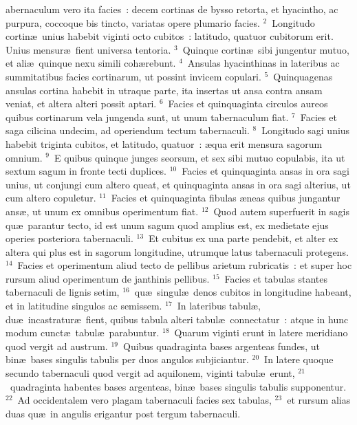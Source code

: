 \bchapter
{}abernaculum vero ita facies~: decem cortinas de bysso retorta, et hyacintho, ac purpura, coccoque bis tincto, variatas opere plumario facies.
${}^{2}$~Longitudo cortin\ae\ unius habebit viginti octo cubitos~: latitudo, quatuor cubitorum erit. Unius mensur\ae\ fient universa tentoria.
${}^{3}$~Quinque cortin\ae\ sibi jungentur mutuo, et ali\ae\ quinque nexu simili coh\ae rebunt.
${}^{4}$~Ansulas hyacinthinas in lateribus ac summitatibus facies cortinarum, ut possint invicem copulari.
${}^{5}$~Quinquagenas ansulas cortina habebit in utraque parte, ita insertas ut ansa contra ansam veniat, et altera alteri possit aptari.
${}^{6}$~Facies et quinquaginta circulos aureos quibus cortinarum vela jungenda sunt, ut unum tabernaculum fiat.
${}^{7}$~Facies et saga cilicina undecim, ad operiendum tectum tabernaculi.
${}^{8}$~Longitudo sagi unius habebit triginta cubitos, et latitudo, quatuor~: \ae qua erit mensura sagorum omnium.
${}^{9}$~E quibus quinque junges seorsum, et sex sibi mutuo copulabis, ita ut sextum sagum in fronte tecti duplices.
${}^{10}$~Facies et quinquaginta ansas in ora sagi unius, ut conjungi cum altero queat, et quinquaginta ansas in ora sagi alterius, ut cum altero copuletur.
${}^{11}$~Facies et quinquaginta fibulas \ae neas quibus jungantur ans\ae , ut unum ex omnibus operimentum fiat.
${}^{12}$~Quod autem superfuerit in sagis qu\ae\ parantur tecto, id est unum sagum quod amplius est, ex medietate ejus operies posteriora tabernaculi.
${}^{13}$~Et cubitus ex una parte pendebit, et alter ex altera qui plus est in sagorum longitudine, utrumque latus tabernaculi protegens.
${}^{14}$~Facies et operimentum aliud tecto de pellibus arietum rubricatis~: et super hoc rursum aliud operimentum de janthinis pellibus.
${}^{15}$~Facies et tabulas stantes tabernaculi de lignis setim,
${}^{16}$~qu\ae\ singul\ae\ denos cubitos in longitudine habeant, et in latitudine singulos ac semissem.
${}^{17}$~In lateribus tabul\ae , du\ae\ incastratur\ae\ fient, quibus tabula alteri tabul\ae\ connectatur~: atque in hunc modum cunct\ae\ tabul\ae\ parabuntur.
${}^{18}$~Quarum viginti erunt in latere meridiano quod vergit ad austrum.
${}^{19}$~Quibus quadraginta bases argenteas fundes, ut bin\ae\ bases singulis tabulis per duos angulos subjiciantur.
${}^{20}$~In latere quoque secundo tabernaculi quod vergit ad aquilonem, viginti tabul\ae\ erunt,
${}^{21}$~quadraginta habentes bases argenteas, bin\ae\ bases singulis tabulis supponentur.
${}^{22}$~Ad occidentalem vero plagam tabernaculi facies sex tabulas,
${}^{23}$~et rursum alias duas qu\ae\ in angulis erigantur post tergum tabernaculi.
